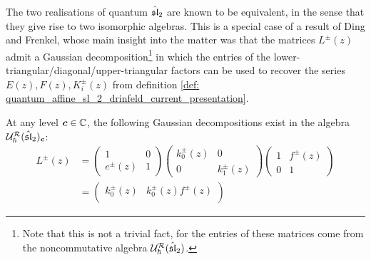         The two realisations of quantum $\hat{\sl}_2$ are known to be equivalent, in the sense that they give rise to two isomorphic algebras. This is a special case of a result of Ding and Frenkel, whose main insight into the matter was that the matrices $L^{\pm}(z)$ admit a Gaussian decomposition\footnote{Note that this is not a trivial fact, for the entries of these matrices come from the noncommutative algebra $\calU_{\hbar}^{\calR}(\hat{\sl}_2)$.} in which the entries of the lower-triangular/diagonal/upper-triangular factors can be used to recover the series $E(z), F(z), K_i^{\pm}(z)$ from definition \ref{def: quantum_affine_sl_2_drinfeld_current_presentation}.
        \begin{lemma} \label{lemma: ding_frenkel_isomorphism_quantum_affine_sl_2}
            At any level $\level \in \bbC$, the following Gaussian decompositions exist in the algebra $\calU_{\hbar}^{\calR}(\hat{\sl}_2)_{\level}$:
                \begin{equation} \label{equation: quantum_affine_sl_2_monodromy_matrices_gaussian_decompositions}
                    \begin{aligned}
                        L^{\pm}(z)
                        & =
                            \begin{pmatrix}
                                1 & 0
                                \\
                                e^{\pm}(z) & 1
                            \end{pmatrix}
                            \begin{pmatrix}
                                k_0^{\pm}(z) & 0
                                \\
                                0 & k_1^{\pm}(z)
                            \end{pmatrix}
                            \begin{pmatrix}
                                1 & f^{\pm}(z)
                                \\
                                0 & 1
                            \end{pmatrix}
                        \\
                        & =
                            \begin{pmatrix}
                                k_0^{\pm}(z) & k_0^{\pm}(z) f^{\pm}(z)
                                \\

\end{pmatrix}
\end{aligned}
\end{equation}
\end{lemma}
